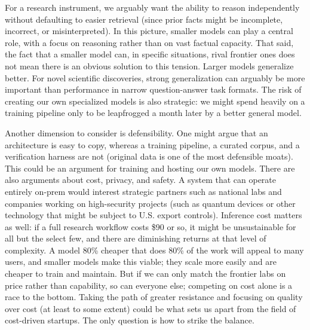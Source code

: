 For a research instrument, we arguably want the ability to reason independently without defaulting to easier retrieval (since prior facts might be incomplete, incorrect, or misinterpreted). In this picture, smaller models can play a central role, with a focus on reasoning rather than on vast factual capacity. That said, the fact that a smaller model can, in specific situations, rival frontier ones does not mean there is an obvious solution to this tension. Larger models generalize better. For novel scientific discoveries, strong generalization can arguably be more important than performance in narrow question-answer task formats. The risk of creating our own specialized models is also strategic: we might spend heavily on a training pipeline only to be leapfrogged a month later by a better general model.

Another dimension to consider is defensibility. One might argue that an architecture is easy to copy, whereas a training pipeline, a curated corpus, and a verification harness are not (original data is one of the most defensible moats). This could be an argument for training and hosting our own models. There are also arguments about cost, privacy, and safety. A system that can operate entirely on-prem would interest strategic partners such as national labs and companies working on high-security projects (such as quantum devices or other technology that might be subject to U.S. export controls). Inference cost matters as well: if a full research workflow costs \$90 or so, it might be unsustainable for all but the select few, and there are diminishing returns at that level of complexity. 
A model 80\% cheaper that does 80\% of the work will appeal to many users, and smaller models make this viable; they scale more easily and are cheaper to train and maintain. But if we can only match the frontier labs on price rather than capability, so can everyone else; competing on cost alone is a race to the bottom. Taking the path of greater resistance and focusing on quality over cost (at least to some extent) could be what sets us apart from the field of cost-driven startups. The only question is how to strike the balance.


